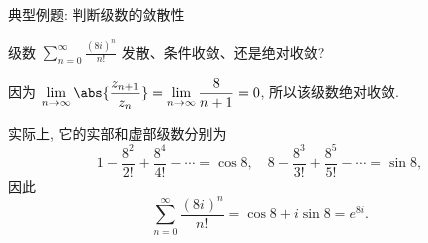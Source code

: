 \begin{frame}{典型例题: 判断级数的敛散性}
	\onslide<+->
	\begin{example}
		级数 $\displaystyle\sum_{n=0}^\infty\frac{(8i)^n}{n!}$ 发散、条件收敛、还是绝对收敛?
	\end{example}

	\onslide<+->
	\begin{solution}
		因为 $\displaystyle\lim_{n\to\infty}\abs{\frac{z_{n+1}}{z_n}}=\lim_{n\to\infty}\dfrac{8}{n+1}=0$, 所以该级数绝对收敛.
	\end{solution}

	\onslide<+->
	实际上, 它的实部和虚部级数分别为
	\[1-\frac{8^2}{2!}+\frac{8^4}{4!}-\cdots=\cos 8,\quad
	8-\frac{8^3}{3!}+\frac{8^5}{5!}-\cdots=\sin 8,\]
	\onslide<+->
	因此
	\[\sum_{n=0}^\infty\frac{(8i)^n}{n!}=\cos 8+i\sin 8=e^{8i}.\]
\end{frame}


